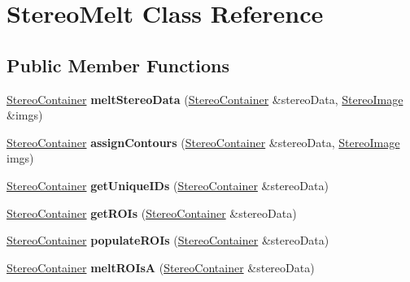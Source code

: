 \hypertarget{classStereoMelt}{}\section{Stereo\+Melt Class Reference}
\label{classStereoMelt}
\subsection*{Public Member Functions}
\begin{DoxyCompactItemize}
\item 
\hyperlink{structStereoContainer}{Stereo\+Container} {\bfseries melt\+Stereo\+Data} (\hyperlink{structStereoContainer}{Stereo\+Container} \&stereo\+Data, \hyperlink{classStereoImage}{Stereo\+Image} \&imgs)\hypertarget{classStereoMelt_a4b192f829f5bac09d013c4963ece7db1}{}\label{classStereoMelt_a4b192f829f5bac09d013c4963ece7db1}

\item 
\hyperlink{structStereoContainer}{Stereo\+Container} {\bfseries assign\+Contours} (\hyperlink{structStereoContainer}{Stereo\+Container} \&stereo\+Data, \hyperlink{classStereoImage}{Stereo\+Image} imgs)\hypertarget{classStereoMelt_a1a5c20eadb8e814748af982649e8a46c}{}\label{classStereoMelt_a1a5c20eadb8e814748af982649e8a46c}

\item 
\hyperlink{structStereoContainer}{Stereo\+Container} {\bfseries get\+Unique\+I\+Ds} (\hyperlink{structStereoContainer}{Stereo\+Container} \&stereo\+Data)\hypertarget{classStereoMelt_ab6a247467cec609d116fc2f2cf42ce0b}{}\label{classStereoMelt_ab6a247467cec609d116fc2f2cf42ce0b}

\item 
\hyperlink{structStereoContainer}{Stereo\+Container} {\bfseries get\+R\+O\+Is} (\hyperlink{structStereoContainer}{Stereo\+Container} \&stereo\+Data)\hypertarget{classStereoMelt_aab99f637c91350d0a84212acf89805c3}{}\label{classStereoMelt_aab99f637c91350d0a84212acf89805c3}

\item 
\hyperlink{structStereoContainer}{Stereo\+Container} {\bfseries populate\+R\+O\+Is} (\hyperlink{structStereoContainer}{Stereo\+Container} \&stereo\+Data)\hypertarget{classStereoMelt_a45fd8a282a96209eea8a92ff6af4a04f}{}\label{classStereoMelt_a45fd8a282a96209eea8a92ff6af4a04f}

\item 
\hyperlink{structStereoContainer}{Stereo\+Container} {\bfseries melt\+R\+O\+IsA} (\hyperlink{structStereoContainer}{Stereo\+Container} \&stereo\+Data)\hypertarget{classStereoMelt_aa7caa74f028127e36a5cc4bd741b562d}{}\label{classStereoMelt_aa7caa74f028127e36a5cc4bd741b562d}


\end{DoxyCompactItemize}
